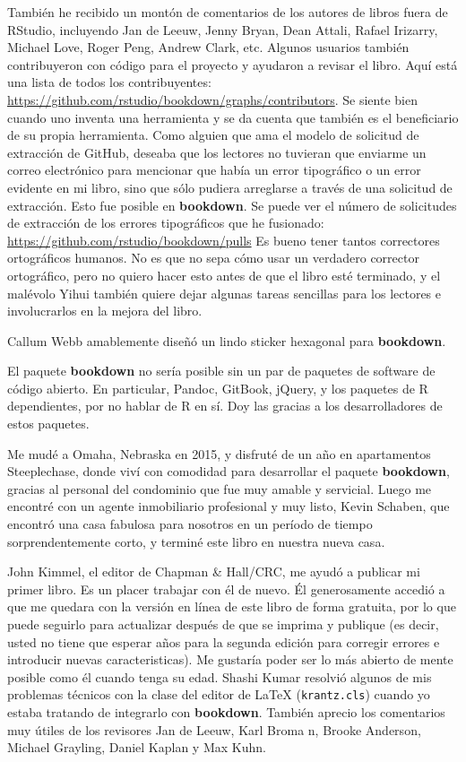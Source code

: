\documentclass[12pt,]{krantz}
\theoremstyle{definition}
\theoremstyle{definition}
\theoremstyle{definition}
\theoremstyle{remark}
\begin{document}
También he recibido un montón de comentarios de los autores de libros
fuera de RStudio, incluyendo Jan de Leeuw, Jenny Bryan, Dean Attali,
Rafael Irizarry, Michael Love, Roger Peng, Andrew Clark, etc. Algunos
usuarios también contribuyeron con código para el proyecto y ayudaron a
revisar el libro. Aquí está una lista de todos los contribuyentes:
\url{https://github.com/rstudio/bookdown/graphs/contributors}. Se siente
bien cuando uno inventa una herramienta y se da cuenta que también es el
beneficiario de su propia herramienta. Como alguien que ama el modelo de
solicitud de extracción de GitHub, deseaba que los lectores no tuvieran
que enviarme un correo electrónico para mencionar que había un error
tipográfico o un error evidente en mi libro, sino que sólo pudiera
arreglarse a través de una solicitud de extracción. Esto fue posible en
\textbf{bookdown}. Se puede ver el número de solicitudes de extracción
de los errores tipográficos que he fusionado:
\url{https://github.com/rstudio/bookdown/pulls} Es bueno tener tantos
correctores ortográficos humanos. No es que no sepa cómo usar un
verdadero corrector ortográfico, pero no quiero hacer esto antes de que
el libro esté terminado, y el malévolo Yihui también quiere dejar
algunas tareas sencillas para los lectores e involucrarlos en la mejora
del libro.

Callum Webb amablemente diseñó un lindo sticker hexagonal para
\textbf{bookdown}.

El paquete \textbf{bookdown} no sería posible sin un par de paquetes de
software de código abierto. En particular, Pandoc, GitBook, jQuery, y
los paquetes de R dependientes, por no hablar de R en sí. Doy las
gracias a los desarrolladores de estos paquetes.

Me mudé a Omaha, Nebraska en 2015, y disfruté de un año en apartamentos
Steeplechase, donde viví con comodidad para desarrollar el paquete
\textbf{bookdown}, gracias al personal del condominio que fue muy amable
y servicial. Luego me encontré con un agente inmobiliario profesional y
muy listo, Kevin Schaben, que encontró una casa fabulosa para nosotros
en un período de tiempo sorprendentemente corto, y terminé este libro en
nuestra nueva casa.

John Kimmel, el editor de Chapman \& Hall/CRC, me ayudó a publicar mi
primer libro. Es un placer trabajar con él de nuevo. Él generosamente
accedió a que me quedara con la versión en línea de este libro de forma
gratuita, por lo que puede seguirlo para actualizar después de que se
imprima y publique (es decir, usted no tiene que esperar años para la
segunda edición para corregir errores e introducir nuevas
caracteristicas). Me gustaría poder ser lo más abierto de mente posible
como él cuando tenga su edad. Shashi Kumar resolvió algunos de mis
problemas técnicos con la clase del editor de LaTeX
(\texttt{krantz.cls}) cuando yo estaba tratando de integrarlo con
\textbf{bookdown}. También aprecio los comentarios muy útiles de los
revisores Jan de Leeuw, Karl Broma n, Brooke Anderson, Michael Grayling,
Daniel Kaplan y Max Kuhn.
\end{document}
